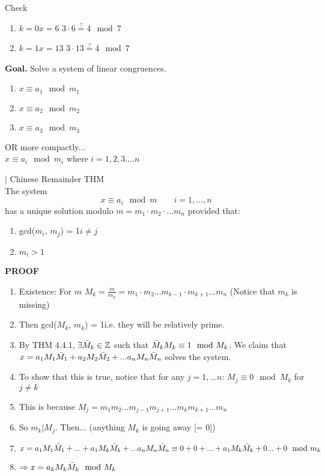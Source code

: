 \documentclass [12pt]{article}
\begin{document}
Check
\begin{enumerate}[\quad]
    \item $k=0$\quad $x=6$ \quad $3\cdot6\stackrel{?}{=}4\mod7$ \quad \checkmark
    \item $k=1$\quad $x=13$ \quad $3\cdot13\stackrel{?}{=}4\mod7$ \quad \checkmark
\end{enumerate}
\pagebreak
\noindent\textbf{Goal.} Solve a system of linear congruences.
\begin{enumerate}[\quad]
    \item $x\equiv a_1\mod m_1$
    \item $x\equiv a_2\mod m_2$
    \item $x\equiv a_3\mod m_3$
\end{enumerate}
OR more compactly...\\
\indent $x\equiv a_i\mod m_i$ where $i=1,2,3....n$
\begin{framed}
\noindent$|$ Chinese Remainder THM\\
The system
\[x\equiv a_i\mod m \quad\quad i=1,...,n\]
has a unique solution modulo $m = m_1\cdot m_2\cdot ... m_n$ provided that:
\begin{enumerate}[\quad (i)]
    \item gcd($m_i$, $m_j$) = 1\quad $i\neq j$
    \item $m_i > 1$
\end{enumerate}
\end{framed}
\noindent\textbf{PROOF}
\begin{enumerate}[\quad]
    \item Existence: For $m$ $M_k=\frac{m}{m_k} = m_1\cdot m_2 ... m_{k-1}\cdot m_{k+1} ... m_n$ \quad (Notice that $m_k$ is missing)
    \item Then gcd($M_k$, $m_k$) = 1\quad i.e. they will be relatively prime.
    \item By THM 4.4.1, $\exists\Bar{M}_k\in\mathbb{Z}$ such that $\Bar{M}_kM_k\equiv1\mod M_k$. We claim that $x=a_1M_1\Bar{M}_1+a_2M_2\Bar{M}_2+...a_nM_n\Bar{M}_n$ solves the system.
    \item To show that this is true, notice that for any $j=1,... n$: $M_j\equiv0\mod M_k$ for $j\neq k$
    \item This is because $M_j=m_1m_2...m_{j-1}m_{j+1}...m_km_{k+1}...m_n$
    \item So $m_k|M_j$. Then... (anything $M_k$ is going away [= 0])
    \item $x=a_1M_1\Bar{M}_1+...+a_1M_k\Bar{M}_k+...a_nM_n\Bar{M}_n\equiv 0+0+...+a_1M_k\Bar{M}_k+0...+0\mod m_k$
    \item $\Rightarrow x=a_kM_k\Bar{M}_k\mod M_k$
\end{enumerate}
\end{document}
